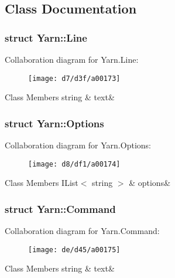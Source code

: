 \subsection{Class Documentation}
\label{db/d44/a00162}
\hypertarget{a00026_db/d44/a00162}{}
\subsubsection{struct Yarn\-:\-:Line}


Collaboration diagram for Yarn.\-Line\-:
\nopagebreak
\begin{figure}[H]
\begin{center}
\leavevmode
\texttt{[image: d7/d3f/a00173]}
\end{center}
\end{figure}
\begin{DoxyFields}{Class Members}
\hypertarget{a00026_a81d1f04bbb4cf6642d2bd685bda1da20}{string}\label{a00026_a81d1f04bbb4cf6642d2bd685bda1da20}
&
text&
\\
\hline

\end{DoxyFields}
\label{db/ddf/a00164}
\hypertarget{a00026_db/ddf/a00164}{}
\subsubsection{struct Yarn\-:\-:Options}


Collaboration diagram for Yarn.\-Options\-:
\nopagebreak
\begin{figure}[H]
\begin{center}
\leavevmode
\texttt{[image: d8/df1/a00174]}
\end{center}
\end{figure}
\begin{DoxyFields}{Class Members}
\hypertarget{a00026_ae8c616d923ceeeed192a9436c55d9917}{I\-List$<$ string $>$}\label{a00026_ae8c616d923ceeeed192a9436c55d9917}
&
options&
\\
\hline

\end{DoxyFields}
\label{de/db9/a00159}
\hypertarget{a00026_de/db9/a00159}{}
\subsubsection{struct Yarn\-:\-:Command}


Collaboration diagram for Yarn.\-Command\-:
\nopagebreak
\begin{figure}[H]
\begin{center}
\leavevmode
\texttt{[image: de/d45/a00175]}
\end{center}
\end{figure}
\begin{DoxyFields}{Class Members}
\hypertarget{a00026_a8564e5104566e145f5d917ec846444d9}{string}\label{a00026_a8564e5104566e145f5d917ec846444d9}
&
text&
\\
\hline

\end{DoxyFields}

